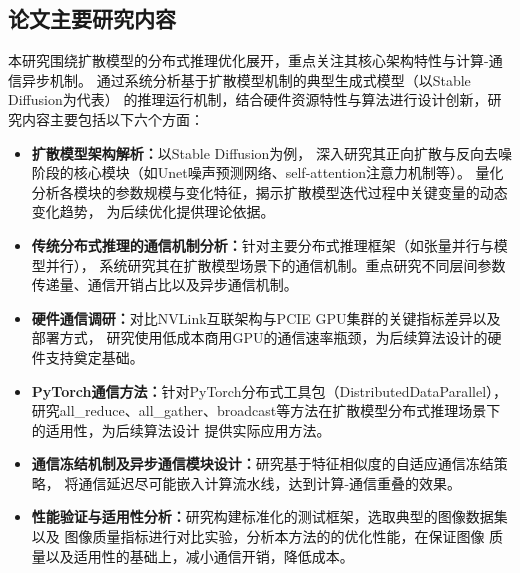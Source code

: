 \subsection{论文主要研究内容}
\par
本研究围绕扩散模型的分布式推理优化展开，重点关注其核心架构特性与计算-通信异步机制。
通过系统分析基于扩散模型机制的典型生成式模型（以Stable Diffusion为代表）
的推理运行机制，结合硬件资源特性与算法进行设计创新，研究内容主要包括以下六个方面：
\begin{itemize}
    \item {\bfseries 扩散模型架构解析：}以Stable Diffusion为例，
    深入研究其正向扩散与反向去噪阶段的核心模块（如Unet噪声预测网络、self-attention注意力机制\cite{dhariwal2021diffusion}等）。
    量化分析各模块的参数规模与变化特征，揭示扩散模型迭代过程中关键变量的动态变化趋势，
    为后续优化提供理论依据。
    \item {\bfseries 传统分布式推理的通信机制分析：}针对主要分布式推理框架（如张量并行与模型并行），
    系统研究其在扩散模型场景下的通信机制。重点研究不同层间参数传递量、通信开销占比以及异步通信机制。
    \item {\bfseries 硬件通信调研：}对比NVLink互联架构与PCIE GPU集群的关键指标差异以及部署方式，
    研究使用低成本商用GPU的通信速率瓶颈，为后续算法设计的硬件支持奠定基础\cite{A100, RTX4090}。
    \item {\bfseries PyTorch通信方法：}针对PyTorch分布式工具包（DistributedDataParallel），
    研究all\_reduce、all\_gather、broadcast等方法在扩散模型分布式推理场景下的适用性，为后续算法设计
    提供实际应用方法\cite{PytorchDistributedDataParallel}。
    \item {\bfseries 通信冻结机制及异步通信模块设计：}研究基于特征相似度的自适应通信冻结策略，
    将通信延迟尽可能嵌入计算流水线，达到计算-通信重叠的效果。
    \item {\bfseries 性能验证与适用性分析：}研究构建标准化的测试框架，选取典型的图像数据集以及
    图像质量指标进行对比实验，分析本方法的的优化性能，在保证图像
    质量以及适用性的基础上，减小通信开销，降低成本。
\end{itemize}

